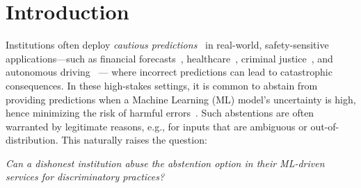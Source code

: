 \section{Introduction}

Institutions often deploy \emph{cautious predictions}~\citep{el2010foundations} in real-world, safety-sensitive applications—such as financial forecasts~\citep{9260038}, healthcare~\citep{kotropoulos2009linear,sousa2009ordinal,guan2020bounded}, criminal justice~\citep{wang2023pursuit}, and autonomous driving~\citep{ghodsi2021generating} --- where incorrect predictions can lead to catastrophic consequences. In these high-stakes settings, it is common to abstain from providing predictions when a Machine Learning (ML) model’s uncertainty is high, hence minimizing the risk of harmful errors~\citep{kotropoulos2009linear,liu2022incorporating,kompa2021second}. Such abstentions are often warranted by legitimate reasons, e.g., for inputs that are ambiguous or out-of-distribution. This naturally raises the question:
\begin{center}
    \textit{Can a dishonest institution abuse the abstention option in their ML-driven services for discriminatory practices?}
\end{center}
